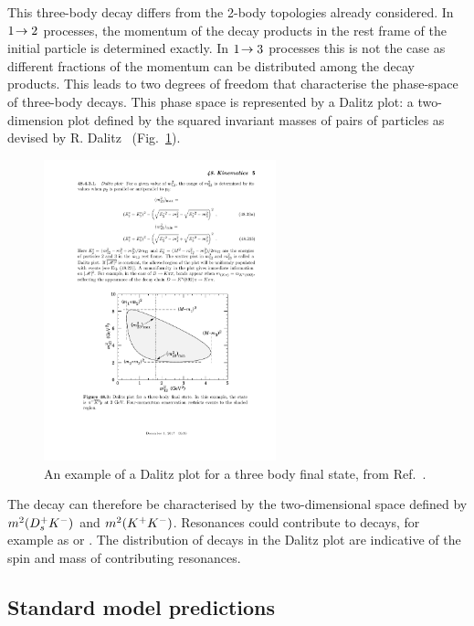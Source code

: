 This three-body decay differs from the 2-body topologies already considered. In $1\!\rightarrow 2$ processes, the momentum of the decay products in the rest frame of the initial particle is determined exactly. In $1\!\rightarrow 3$ processes this is not the case as different fractions of the momentum can be distributed among the decay products. This leads to two degrees of freedom that characterise the phase-space of three-body decays. This phase space is represented by a Dalitz plot: a two-dimension plot defined by the squared invariant masses of pairs of particles as devised by R. Dalitz~\cite{PhysRev.94.1046} (Fig.~\ref{fig:Theory_Dalitz}).
\begin{figure}[!h]
    \centering
    \includegraphics[width=0.6\textwidth]{figs/Theory/DalitzpPlot.pdf}
    \caption{An example of a Dalitz plot for a three body final state, from Ref.~\cite{PDG2016}.}
    \label{fig:Theory_Dalitz}   
\end{figure}
The decay \decay{\Bp}{\Dsp\Kp\Km} can therefore be characterised by the two-dimensional space defined by $m^{2}({{D}^+_{s}}{{K}^-})$ and $m^{2}({{K}^+}{{K}^-})$. Resonances could contribute to \decay{\Bp}{\Dsp\Kp\Km} decays, for example as  or . The distribution of decays in the Dalitz plot are indicative of the spin and mass of contributing resonances.


\subsection{Standard model predictions}

